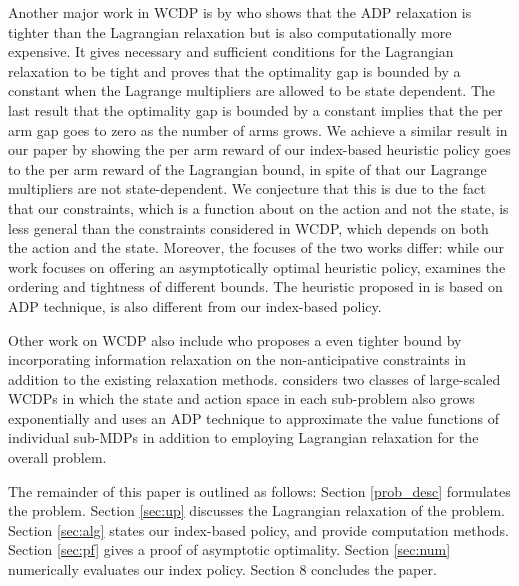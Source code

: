 Another major work in WCDP is by \cite{adel2008} who shows that the ADP relaxation is tighter than the Lagrangian relaxation but is also computationally more expensive. It gives necessary and sufficient conditions for the Lagrangian relaxation to be tight and proves that the optimality gap is bounded by a constant when the Lagrange multipliers are allowed to be state dependent. The last result that the optimality gap is bounded by a constant implies that the per arm gap goes to zero as the number of arms grows. We achieve a similar result in our paper by showing the per arm reward of our index-based heuristic policy goes to the per arm reward of the Lagrangian bound, in spite of that our Lagrange multipliers are not state-dependent. We conjecture that this is due to the fact that our constraints, which is a function about on the action and not the state, is less general than the constraints considered in WCDP, which depends on both the action and the state. Moreover, the focuses of the two works differ: while our work focuses on offering an asymptotically optimal heuristic policy, \cite{adel2008} examines the ordering and tightness of different bounds. The heuristic proposed in \cite{adel2008} is based on ADP technique, is also different from our index-based policy.

Other work on WCDP also include \cite{Ye2014} who proposes a even tighter bound by incorporating information relaxation on the non-anticipative constraints in addition to the existing relaxation methods. \cite{Gocgun2011} considers two classes of large-scaled WCDPs in which the state and action space in each sub-problem also grows exponentially and uses an ADP technique to approximate the value functions of individual sub-MDPs in addition to employing Lagrangian relaxation for the overall problem. 

The remainder of this paper is outlined as follows: Section \ref{prob_desc} formulates the problem. Section \ref{sec:up} discusses the Lagrangian relaxation of the problem. Section \ref{sec:alg} states our index-based policy, and provide computation methods. Section \ref{sec:pf} gives a proof of asymptotic optimality. Section \ref{sec:num} numerically evaluates our index policy. Section 8 concludes the paper.


